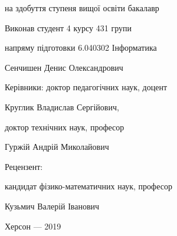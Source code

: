 \thispagestyle{empty}

{

на здобуття ступеня вищої освіти бакалавр

}

\vfill

\hfill\begin{minipage}[t]{0.65\textwidth}

Виконав студент 4 курсу 431 групи 

напряму підготовки 6.040302 Інформатика

Сенчишен Денис Олександрович

Керівники: доктор педагогічних наук, доцент

Круглик Владислав Сергійович,

доктор технічних наук, професор

Гуржій Андрій Миколайович

Рецензент: 

кандидат фізико-математичних наук, професор

Кузьмич Валерій Іванович


\end{minipage}

\vfill

{\centering
Херсон --- 2019

}